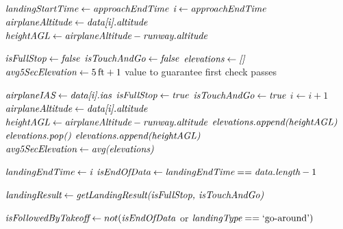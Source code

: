    	\begin{algorithm}
    	\begin{algorithmic}[1]
        	\State $ \textit{landingStartTime} \gets \textit{approachEndTime} $
        	\State $ \textit{i} \gets \textit{approachEndTime} $
        	\State $ \textit{airplaneAltitude} \gets \textit{data[i].altitude} $
            \State $ \textit{heightAGL} \gets \textit{airplaneAltitude} - \textit{runway.altitude} $
            
            \State $ \textit{isFullStop} \gets \textit{false} $
            \State $ \textit{isTouchAndGo} \gets \textit{false} $
            \State $ \textit{elevations} \gets \textit{[]}$
            \State $ \textit{avg5SecElevation} \gets 5\,\text{ft} + 1 $
            	\Comment value to guarantee first check passes
            
                	\State $ \textit{airplaneIAS} \gets \textit{data[i].ias} $
                    	\State $ \textit{isFullStop} \gets \textit{true} $
                    	\State $ \textit{isTouchAndGo} \gets \textit{true} $
                    \EndIf
                \EndIf
                \State $ i \gets i + 1 $
                \State $ \textit{airplaneAltitude} \gets \textit{data[i].altitude} $
                \State $ \textit{heightAGL} \gets \textit{airplaneAltitude} - \textit{runway.altitude} $
                	\State $ \textit{elevations.append(heightAGL)} $
                \Else
                	\State $ \textit{elevations.pop()} $
                    \State $ \textit{elevations.append(heightAGL)} $
                    \State $ \textit{avg5SecElevation} \gets \textit{avg(elevations)} $
                \EndIf
            \EndWhile
            
            \State $ \textit{landingEndTime} \gets \textit{i} $
            \State $ \textit{isEndOfData} \gets \textit{landingEndTime} == \textit{data.length} - 1 $
            
            \State $ \textit{landingResult} \gets \textit{getLandingResult(isFullStop, isTouchAndGo)} $
         
            \State $ \textit{isFollowedByTakeoff} \gets not (\textit{isEndOfData} $ or $ \textit{landingType} == \text{`go-around'}) $
            

\end{algorithmic}
\end{algorithm}
